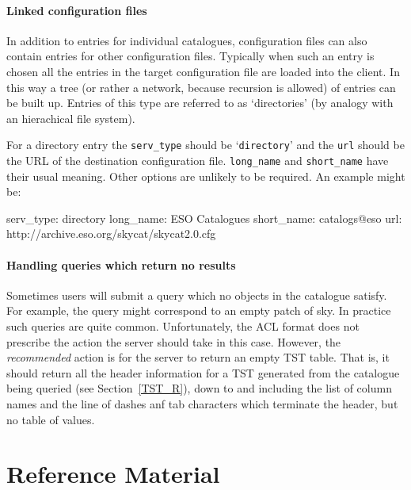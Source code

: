 \documentclass[twoside,11pt,nolof,chapters]{starlink}
\begin{document}
\subsection{Linked configuration files}

In addition to entries for individual catalogues, configuration files
can also contain entries for other configuration files.  Typically
when such an entry is chosen all the entries in the target configuration
file are loaded into the client.  In this way a tree (or rather a network,
because recursion is allowed) of entries can be built up.  Entries of
this type are referred to as `directories' (by analogy with an hierachical
file system).

For a directory entry the \texttt{serv\_type} should be `\texttt{directory}'
and the \texttt{url} should be the URL of the destination configuration
file.  \texttt{long\_name} and \texttt{short\_name} have their usual meaning.
Other options are unlikely to be required.  An example might be:

\begin{terminalv}
serv_type:      directory
long_name:      ESO Catalogues
short_name:     catalogs@eso
url:            http://archive.eso.org/skycat/skycat2.0.cfg
\end{terminalv}

\subsection{Handling queries which return no results}

Sometimes users will submit a query which no objects in the catalogue
satisfy.  For example, the query might correspond to an empty patch of
sky.  In practice such queries are quite common.  Unfortunately, the ACL
format does not prescribe the action the server should take in this case.
However, the \textit{recommended}\/ action is for the server to return an
empty TST table.  That is, it should return all the header information
for a TST generated from the catalogue being queried (see
Section~\ref{TST_R}), down to and including the list of column names
and the line of dashes anf tab characters which terminate the header,
but no table of values.


\cleardoublepage

\part{Reference Material}
\end{document}

